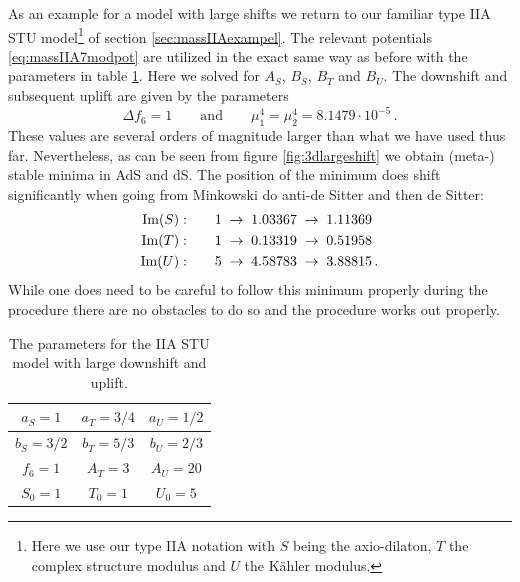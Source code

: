 \documentclass[12pt]{report}
\newcommand{\be}{\begin{equation}}
\newcommand{\ee}{\end{equation}}
\newcommand{\bea}{\begin{equation}\begin{aligned}}
\newcommand{\eea}{\end{aligned}\end{equation}}
\def\rmim{{\rm Im}}
\begin{document}
As an example for a model with large shifts we return to our familiar type IIA STU model\footnote{Here we use our type IIA notation with $S$ being the axio-dilaton, $T$ the complex structure modulus and $U$ the Kähler modulus.} of section \ref{sec:massIIAexampel}. The relevant potentials \eqref{eq:massIIA7modpot} are utilized in the exact same way as before with the parameters in table \ref{tab:largpara}. Here we solved for $A_S$, $B_S$, $B_T$ and $B_U$. The downshift and subsequent uplift are given by the parameters
\be 
\Delta f_6 = 1 \qquad \text{and} \qquad \mu_1^4 = \mu_2^4 = 8.1479 \cdot 10 ^{-5}\,.
\ee
These values are several orders of magnitude larger than what we have used thus far. Nevertheless, as can be seen from figure \ref{fig:3dlargeshift} we obtain (meta-) stable minima in AdS and dS. The position of the minimum does shift significantly when going from Minkowski do anti-de Sitter and then de Sitter:
\bea 
\rmim(S):& \qquad 1 \; \to \; 1.03367 \; \to \; 1.11369 \\
\rmim(T):& \qquad 1 \; \to \; 0.13319 \; \to \; 0.51958 \\
\rmim(U):& \qquad 5 \; \to \; 4.58783 \; \to \; 3.88815 \,.
\eea
While  one does need to be careful to follow this minimum properly during the procedure there are no obstacles to do so and the procedure works out properly.
\begin{table}[htb]
\centering
\begin{tabular}{|c|c|c|}\hline
$a_S = 1$ & $a_T = 3/4$ & $a_U = 1/2$\\\hline
$b_S = 3/2$ & $b_T =5/3$ & $b_U = 2/3$\\\hline
$f_6 = 1 $ & $A_T = 3$ & $A_U =20$\\\hline
$S_0 = 1$ & $T_0 = 1$ & $U_0 = 5$\\\hline
\end{tabular}
\caption{ The parameters for the IIA STU model with large downshift and uplift.}
\label{tab:largpara}
\end{table}
\end{document}
